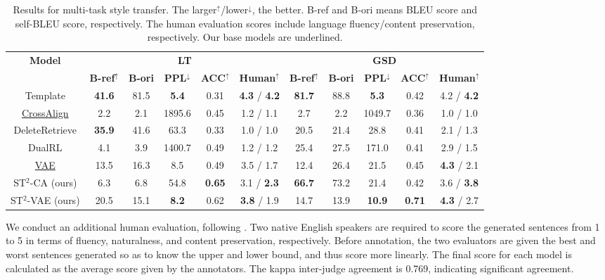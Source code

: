 \begin{table}[th]\footnotesize
	\centering
	\begin{tabular}{c|ccccc|ccccc}
		\hline
		\multirow{2}{*}{\textbf{Model}} & \multicolumn{5}{c|}{\textbf{LT}} & \multicolumn{5}{c}{\textbf{GSD}} \\
		\cline{2-11}
		& \textbf{B-ref}$^{\uparrow}$ & \textbf{B-ori} & \textbf{PPL}$^\downarrow$ & \textbf{ACC}$^\uparrow$ & \textbf{Human}$^\uparrow$ & \textbf{B-ref}$^\uparrow$ & \textbf{B-ori} & \textbf{PPL}$^\downarrow$ & \textbf{ACC}$^\uparrow$ & \textbf{Human}$^\uparrow$ \\
		\hline
		Template & \textbf{41.6} & 81.5 & \textbf{5.4} & 0.31 & \textbf{4.3} / \textbf{4.2} & \textbf{81.7} & 88.8 & \textbf{5.3} & 0.42 & 4.2 / \textbf{4.2} \\
		\underline{CrossAlign} & 2.2 & 2.1 & 1895.6 & 0.45 & 1.2 / 1.1 & 2.7 & 2.2 & 1049.7 & 0.36 & 1.0 / 1.0 \\
		DeleteRetrieve & \textbf{35.9} & 41.6 & 63.3 & 0.33 & 1.0 / 1.0 & 20.5 & 21.4 & 28.8 & 0.41 & 2.1 / 1.3 \\
		DualRL & 4.1 & 3.9 & 1400.7 & 0.49 & 1.2 / 1.2 & 25.4 & 27.5 & 171.0 & 0.41 & 2.9 / 1.5 \\
		\underline{VAE} & 13.5 & 16.3 & 8.5 & 0.49 & 3.5 / 1.7 & 12.4 & 26.4 & 21.5 & 0.45 & \textbf{4.3} / 2.1 \\
		\hline
		ST$^2$-CA (ours) & 6.3 & 6.8 & 54.8 & \textbf{0.65} & 3.1 / \textbf{2.3} & \textbf{66.7} & 73.2 & 21.4 & 0.42 & 3.6 / \textbf{3.8} \\
		ST$^2$-VAE (ours) & 20.5 & 15.1 & \textbf{8.2} & 0.62 & \textbf{3.8} / 1.9 & 14.7 & 13.9 & \textbf{10.9} & \textbf{0.71} & \textbf{4.3} / 2.7 \\
		\hline
	\end{tabular}
	\caption{Results for multi-task style transfer. The larger$^\uparrow$/lower$^\downarrow$, the better. B-ref and B-ori means BLEU score and self-BLEU score, respectively. The human evaluation scores include language fluency/content preservation, respectively. Our base models are underlined.}\label{tb:exp1}
\end{table}

We conduct an additional human evaluation, following \citet{luo2019dual}. Two native English speakers are required to score the generated sentences from 1 to 5 in terms of fluency, naturalness, and content preservation, respectively. Before annotation, the two evaluators are given the best and worst sentences generated so as to know the upper and lower bound, and thus score more linearly. The final score for each model is calculated as the average score given by the annotators. The kappa inter-judge agreement is 0.769, indicating significant agreement. 

